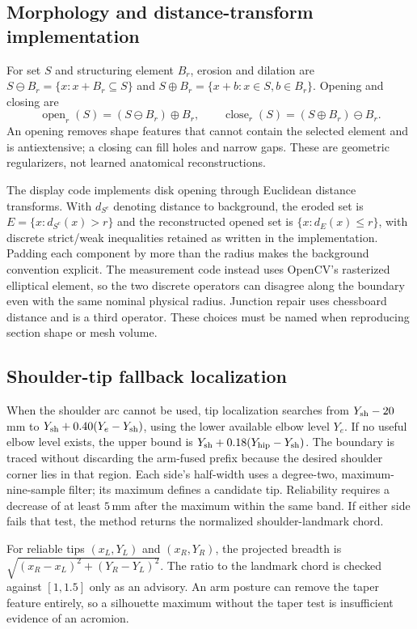 \subsection{Morphology and distance-transform implementation}
For set $S$ and structuring element $B_r$, erosion and dilation are $S\ominus B_r=\{x:x+B_r\subseteq S\}$ and $S\oplus B_r=\{x+b:x\in S,b\in B_r\}$. Opening and closing are
\begin{equation}
\operatorname{open}_r(S)=(S\ominus B_r)\oplus B_r,\qquad
\operatorname{close}_r(S)=(S\oplus B_r)\ominus B_r.
\end{equation}
An opening removes shape features that cannot contain the selected element and is antiextensive; a closing can fill holes and narrow gaps. These are geometric regularizers, not learned anatomical reconstructions.

The display code implements disk opening through Euclidean distance transforms. With $d_{S^c}$ denoting distance to background, the eroded set is $E=\{x:d_{S^c}(x)>r\}$ and the reconstructed opened set is $\{x:d_E(x)\le r\}$, with discrete strict/weak inequalities retained as written in the implementation. Padding each component by more than the radius makes the background convention explicit. The measurement code instead uses OpenCV's rasterized elliptical element, so the two discrete operators can disagree along the boundary even with the same nominal physical radius. Junction repair uses chessboard distance and is a third operator. These choices must be named when reproducing section shape or mesh volume.

\subsection{Shoulder-tip fallback localization}
When the shoulder arc cannot be used, tip localization searches from $Y_{\rm sh}-20$\,mm to $Y_{\rm sh}+0.40(Y_e-Y_{\rm sh})$, using the lower available elbow level $Y_e$. If no useful elbow level exists, the upper bound is $Y_{\rm sh}+0.18(Y_{\rm hip}-Y_{\rm sh})$. The boundary is traced without discarding the arm-fused prefix because the desired shoulder corner lies in that region. Each side's half-width uses a degree-two, maximum-nine-sample filter; its maximum defines a candidate tip. Reliability requires a decrease of at least $5$\,mm after the maximum within the same band. If either side fails that test, the method returns the normalized shoulder-landmark chord.

For reliable tips $(x_L,Y_L)$ and $(x_R,Y_R)$, the projected breadth is $\sqrt{(x_R-x_L)^2+(Y_R-Y_L)^2}$. The ratio to the landmark chord is checked against $[1,1.5]$ only as an advisory. An arm posture can remove the taper feature entirely, so a silhouette maximum without the taper test is insufficient evidence of an acromion.


